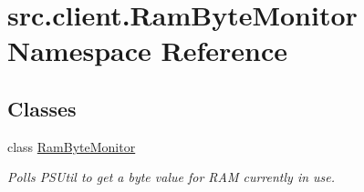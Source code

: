 \hypertarget{namespacesrc_1_1client_1_1_ram_byte_monitor}{\section{src.\-client.\-Ram\-Byte\-Monitor Namespace Reference}
\label{namespacesrc_1_1client_1_1_ram_byte_monitor}
}
\subsection*{Classes}
\begin{DoxyCompactItemize}
\item 
class \hyperlink{classsrc_1_1client_1_1_ram_byte_monitor_1_1_ram_byte_monitor}{Ram\-Byte\-Monitor}
\begin{DoxyCompactList}\small\item\em Polls P\-S\-Util to get a byte value for R\-A\-M currently in use. \end{DoxyCompactList}\end{DoxyCompactItemize}
